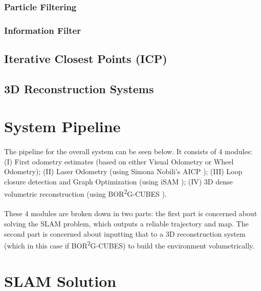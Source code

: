 \documentclass[11pt]{article}
\begin{document}
	\subsubsection{Particle Filtering}
	\paragraph{} \cite{Montemerlo02fastslam:a}\cite{772544}
	
	\subsubsection{Information Filter}
	\subsection{Iterative Closest Points (ICP)}
	\subsection{3D Reconstruction Systems}

	\newpage
	\section{System Pipeline} \label{pipeline}
	\paragraph{}
	The pipeline for the overall system can be seen below. It consists of 4 modules: (I) First odometry estimates (based on either Visual Odometry or Wheel Odometry); (II) Laser Odometry (using Simona Nobili's AICP \cite{7989547}); (III) Loop closure detection and Graph Optimization (using iSAM \cite{Kaess08tro}); (IV) 3D dense volumetric reconstruction (using BOR\textsuperscript{2}G-CUBES \cite{TannerFSR2015}\cite{TannerArXiv2016}).

	\paragraph{}
	These 4 modules are broken down in two parts: the first part is concerned about solving the SLAM problem, which outputs a reliable trajectory and map. The second part is concerned about inputting that to a 3D reconstruction system (which in this case if BOR\textsuperscript{2}G-CUBES) to build the environment volumetrically.

	\newpage
	\section{SLAM Solution}
\end{document}
